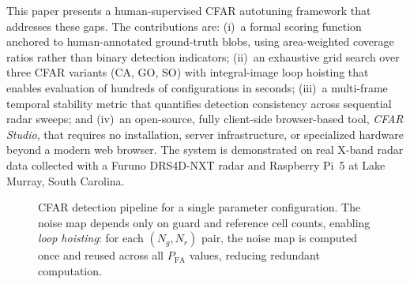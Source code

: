 \documentclass[conf]{new-aiaa}
\begin{document}
This paper presents a human-supervised CFAR autotuning framework that addresses these gaps. The contributions are: (i)~a formal scoring function anchored to human-annotated ground-truth blobs, using area-weighted coverage ratios rather than binary detection indicators; (ii)~an exhaustive grid search over three CFAR variants (CA, GO, SO) with integral-image loop hoisting that enables evaluation of hundreds of configurations in seconds; (iii)~a multi-frame temporal stability metric that quantifies detection consistency across sequential radar sweeps; and (iv)~an open-source, fully client-side browser-based tool, \emph{CFAR Studio}, that requires no installation, server infrastructure, or specialized hardware beyond a modern web browser. The system is demonstrated on real X-band radar data collected with a Furuno DRS4D-NXT radar and Raspberry Pi~5 at Lake Murray, South Carolina.

\begin{figure}[t]
    \centering
    \caption{CFAR detection pipeline for a single parameter configuration. The noise map depends only on guard and reference cell counts, enabling \emph{loop hoisting}: for each $(N_g, N_r)$ pair, the noise map is computed once and reused across all $P_{\mathrm{FA}}$ values, reducing redundant computation.}
    \label{fig:cfar_pipeline}
\end{figure}
\end{document}
